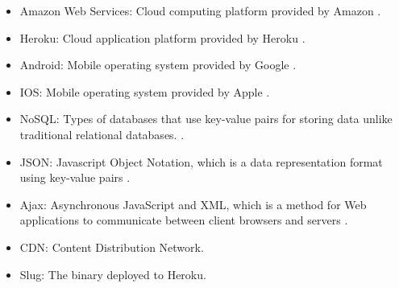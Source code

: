 \begin{itemize}
\item Amazon Web Services: Cloud computing platform provided by Amazon \cite{AWS}.
\item Heroku: Cloud application platform provided by Heroku \cite{Heroku}.
\item Android: Mobile operating system provided by Google \cite{Android}.
\item IOS: Mobile operating system provided by Apple \cite{IOS}.
\item NoSQL: Types of databases that use key-value pairs for storing data unlike traditional relational databases. \cite{NoSql}.
\item JSON: Javascript Object Notation, which is a data representation format using key-value pairs \cite{json}.
\item Ajax:  Asynchronous JavaScript and XML, which is a method for Web applications to communicate between client browsers and servers \cite{Ajax}.
\item CDN: Content Distribution Network.
\item Slug: The binary deployed to Heroku.
\end{itemize}


